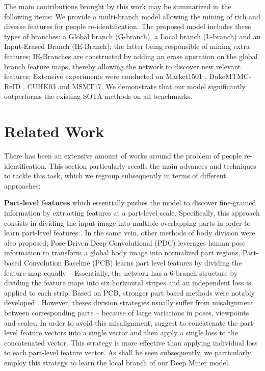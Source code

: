 \documentclass[final]{cvpr}
\begin{document}
The main contributions brought by this work may be summarized in the following items:  We provide a multi-branch model allowing the mining of rich and diverse features for people re-identification. The proposed model includes three types of branches: a Global branch (G-branch), a Local branch (L-branch) and an Input-Erased Branch (IE-Branch); the latter being responsible of mining extra features;
 IE-Branches are constructed by adding an erase operation on the global branch feature maps, thereby allowing the network to discover new relevant features;
 Extensive experiments were conducted on Market1501 \cite{zheng2015scalable}, DukeMTMC-ReID \cite{ristani2016performance}, CUHK03 \cite{li2014deepreid} and MSMT17\cite{wei2018person}. We demonstrate that our model significantly outperforms the existing SOTA methods on all benchmarks.

\section{Related Work}
There has been an extensive amount of works around the problem of people re-identification. This section particularly recalls the main advances and techniques to tackle this task, which we regroup subsequently in terms of different approaches:

\textbf{Part-level features} which essentially pushes the model to discover fine-grained information by extracting features at a part-level scale. Specifically, this approach consists in dividing the input image into multiple overlapping parts in order to learn part-level features \cite{yi2014deep, li2014deepreid}. In the same vein, other methods of body division were also proposed; Pose-Driven Deep Convolutional (PDC) leverages human pose information to transform a global body image into normalized part regions, Part-based Convolution Baseline (PCB) \cite{sun2018beyond} learns part level features by dividing the feature map equally -- Essentially, the network has a 6-branch structure by dividing the feature maps into six horizontal stripes and an independent loss is applied to each strip. Based on PCB, stronger part based methods were notably developed \cite{zheng2019pyramidal, quan2019auto, wang2018learning}. However, theses division strategies usually suffer from misalignment between corresponding parts -- because of large variations in poses, viewpoints and scales. In order to avoid this misalignment, \cite{xie2020learning} suggest to concatenate the part-level feature vectors into a single vector and then apply a single loss to the concatenated vector. This strategy is more effective than applying individual loss to each part-level feature vector. As shall be seen subsequently, we particularly employ this strategy to learn the local branch of our Deep Miner model.
\end{document}
